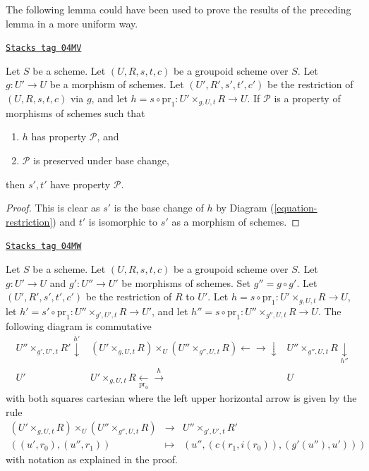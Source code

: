 The following lemma could have been used to prove the results of the preceding
lemma in a more uniform way.

\begin{lemma}
\label{more-groupoids-lemma-restrict-property}
\href{https://stacks.math.columbia.edu/tag/04MV}{\texttt{Stacks tag 04MV}}

Let $S$ be a scheme.
Let $(U, R, s, t, c)$ be a groupoid scheme over $S$.
Let $g : U' \to U$ be a morphism of schemes.
Let $(U', R', s', t', c')$ be the restriction of
$(U, R, s, t, c)$ via $g$, and let
$h = s \circ \text{pr}_1 : U' \times_{g, U, t} R \to U$. If
$\mathcal{P}$ is a property of morphisms of schemes such that
\begin{enumerate}
\item $h$ has property $\mathcal{P}$, and
\item $\mathcal{P}$ is preserved under base change,
\end{enumerate}
then $s', t'$ have property $\mathcal{P}$.
\end{lemma}

\begin{proof}
This is clear as $s'$ is the base change of $h$ by
Diagram (\ref{equation-restriction})
and $t'$ is isomorphic to $s'$ as a morphism of schemes.
\end{proof}

\begin{lemma}
\label{more-groupoids-lemma-double-restrict}
\href{https://stacks.math.columbia.edu/tag/04MW}{\texttt{Stacks tag 04MW}}

Let $S$ be a scheme.
Let $(U, R, s, t, c)$ be a groupoid scheme over $S$.
Let $g : U' \to U$ and $g' : U'' \to U'$ be morphisms of schemes.
Set $g'' = g \circ g'$.
Let $(U', R', s', t', c')$ be the restriction of $R$ to $U'$.
Let $h = s \circ \text{pr}_1 : U' \times_{g, U, t} R \to U$,
let $h' = s' \circ \text{pr}_1 : U'' \times_{g', U', t} R \to U'$, and
let $h'' = s \circ \text{pr}_1 : U'' \times_{g'', U, t} R \to U$.
The following diagram is commutative
$$
\begin{array}{ccc}U'' \times_{g', U', t} R' \overset{h'}{\downarrow} & (U' \times_{g, U, t} R) \times_U (U'' \times_{g'', U, t} R)
\longleftarrow\longrightarrow\downarrow & U'' \times_{g'', U, t} R \underset{h''}{\downarrow} \\ U' & U' \times_{g, U, t} R \underset{\text{pr}_0}{\longleftarrow}\overset{h}{\longrightarrow} & U\end{array}
$$
with both squares cartesian where the left upper horizontal arrow
is given by the rule
$$
\begin{matrix}
(U' \times_{g, U, t} R) \times_U (U'' \times_{g'', U, t} R) &
\longrightarrow &
U'' \times_{g', U', t} R' \\
((u', r_0), (u'', r_1)) &
\longmapsto &
(u'', (c(r_1, i(r_0)), (g'(u''), u')))
\end{matrix}
$$
with notation as explained in the proof.
\end{lemma}

